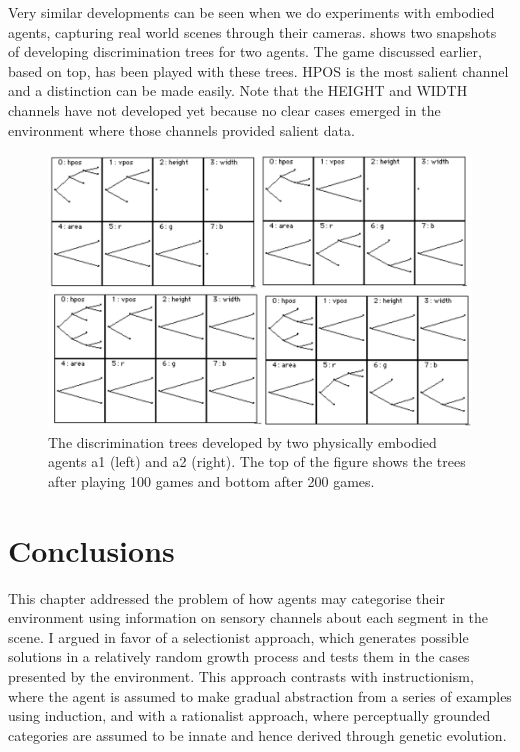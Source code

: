 Very similar developments can be seen when we do 
experiments with embodied agents, capturing real world scenes
through their cameras.  
shows two snapshots of developing discrimination trees
for two agents. The game discussed earlier, based on  top, 
has been played with these trees. 
HPOS is the most salient channel and a distinction can 
be made easily. Note that the HEIGHT and WIDTH channels have not 
developed yet because no clear cases emerged 
in the environment where those channels provided 
salient data. 

\begin{figure}[htbp]
  \centerline{\includegraphics[width=\textwidth]{chap4/figs/discri200.pdf}}
\caption{\label{discri200a}The discrimination trees 
developed by two physically embodied agents 
{\bfshape a1} (left) and {\bfshape a2} (right). The top of the 
figure shows the trees after 
playing 100 games and bottom after 200 games.}
\end{figure}

\section{Conclusions}

This chapter addressed the problem of how agents may 
categorise their environment using information 
on sensory channels about each segment in the scene. 
I argued in favor of a selectionist approach, which 
generates possible solutions in a relatively 
random growth process and tests them in the 
cases presented by the environment. 
This approach contrasts with instructionism, where
the agent is assumed to make gradual abstraction 
from a series of examples using induction, and with 
a rationalist approach, where perceptually grounded categories are
assumed to be innate and hence derived through 
genetic evolution. 

